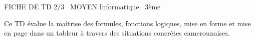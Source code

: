 \documentclass[11pt]{article}
\begin{document}
\begin{tcolorbox}[enhanced,colback=popink,colframe=popink,arc=10pt,boxrule=0pt,left=12pt,right=12pt,top=9pt,bottom=9pt]
{\color{white}\popxbold\small FICHE DE TD 2/3 \textbullet\ MOYEN \hfill Informatique \textbullet\ 3ème\par}
\end{tcolorbox}
\vspace{4pt}
\noindent Ce TD évalue la maîtrise des formules, fonctions logiques, mise en forme et mise en page dans un tableur à travers des situations concrètes camerounaises.
\end{document}
